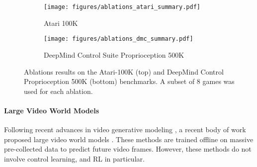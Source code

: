 \begin{figure}[t]
    \centering

    
\begin{subfigure}[b]{\linewidth}
   \texttt{[image: figures/ablations\_atari\_summary.pdf]}
   \caption{Atari 100K}
   \label{fig:ablations-atari}
\end{subfigure}
\vskip 0.1in
\begin{subfigure}[b]{\linewidth}
   \texttt{[image: figures/ablations\_dmc\_summary.pdf]}
   \caption{DeepMind Control Suite Proprioception 500K}
   \label{fig:ablations-dmc}
\end{subfigure}
    
    \caption{Ablations results on the Atari-100K (top) and DeepMind Control Proprioception 500K (bottom) benchmarks. A subset of 8 games was used for each ablation.}
    \label{fig:ablations-results}
\end{figure}





\paragraph{Large Video World Models}
Following recent advances in video generative modeling \cite{ho2022imagenVideo, blattmann2023stable, videoworldsimulators2024}, a recent body of work proposed large video world models \cite{genie2, agarwal2025cosmos, oasis2024, valevski2024gameNGen}.
These methods are trained offline on massive pre-collected data to predict future video frames.
However, these methods do not involve control learning, and RL in particular.


